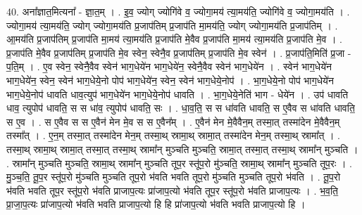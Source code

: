 \documentclass[17pt]{extarticle}
\begin{document}
40. अना᳚ज्ञात॒मित्यना᳚ - ज्ञा॒त॒म् । . इ॒व॒ ज्योग् ज्योगि॑वे व॒ ज्योगा॒मय॑ त्या॒मय॑ति॒ ज्योगि॑वे व॒ ज्योगा॒मय॑ति । . ज्योगा॒मय॑ त्या॒मय॑ति॒ ज्योग् ज्योगा॒मय॑ति प्र॒जाप॑तिम् प्र॒जाप॑ति मा॒मय॑ति॒ ज्योग् ज्योगा॒मय॑ति प्र॒जाप॑तिम् । . आ॒मय॑ति प्र॒जाप॑तिम् प्र॒जाप॑ति मा॒मय॑ त्या॒मय॑ति प्र॒जाप॑ति मे॒वैव प्र॒जाप॑ति मा॒मय॑ त्या॒मय॑ति प्र॒जाप॑ति मे॒व । . प्र॒जाप॑ति मे॒वैव प्र॒जाप॑तिम् प्र॒जाप॑ति मे॒व स्वेन॒ स्वेनै॒व प्र॒जाप॑तिम् प्र॒जाप॑ति मे॒व स्वेन॑ । . प्र॒जाप॑ति॒मिति॑ प्र॒जा - प॒ति॒म् । . ए॒व स्वेन॒ स्वेनै॒वैव स्वेन॑ भाग॒धेये॑न भाग॒धेये॑न॒ स्वेनै॒वैव स्वेन॑ भाग॒धेये॑न । . स्वेन॑ भाग॒धेये॑न भाग॒धेये॑न॒ स्वेन॒ स्वेन॑ भाग॒धेये॒नो पोप॑ भाग॒धेये॑न॒ स्वेन॒ स्वेन॑ भाग॒धेये॒नोप॑ । . भा॒ग॒धेये॒नो पोप॑ भाग॒धेये॑न भाग॒धेये॒नोप॑ धावति धाव॒त्युप॑ भाग॒धेये॑न भाग॒धेये॒नोप॑ धावति । . भा॒ग॒धेये॒नेति॑ भाग - धेये॑न । . उप॑ धावति धाव॒ त्युपोप॑ धावति॒ स स धा॑व॒ त्युपोप॑ धावति॒ सः । . धा॒व॒ति॒ स स धा॑वति धावति॒ स ए॒वैव स धा॑वति धावति॒ स ए॒व । . स ए॒वैव स स ए॒वैन॑ मेन मे॒व स स ए॒वैन᳚म् । . ए॒वैन॑ मेन मे॒वैवैन॒म् तस्मा॒त् तस्मा॑देन मे॒वैवैन॒म् तस्मा᳚त् । . ए॒न॒म् तस्मा॒त् तस्मा॑देन मेन॒म् तस्मा॒थ् स्रामा॒थ् स्रामा॒त् तस्मा॑देन मेन॒म् तस्मा॒थ् स्रामा᳚त् । . तस्मा॒थ् स्रामा॒थ् स्रामा॒त् तस्मा॒त् तस्मा॒थ् स्रामा᳚न् मुञ्चति मुञ्चति॒ स्रामा॒त् तस्मा॒त् तस्मा॒थ् स्रामा᳚न् मुञ्चति । . स्रामा᳚न् मुञ्चति मुञ्चति॒ स्रामा॒थ् स्रामा᳚न् मुञ्चति तूप॒र स्तू॑प॒रो मु॑ञ्चति॒ स्रामा॒थ् स्रामा᳚न् मुञ्चति तूप॒रः । . मु॒ञ्च॒ति॒ तू॒प॒र स्तू॑प॒रो मु॑ञ्चति मुञ्चति तूप॒रो भ॑वति भवति तूप॒रो मु॑ञ्चति मुञ्चति तूप॒रो भ॑वति । . तू॒प॒रो भ॑वति भवति तूप॒र स्तू॑प॒रो भ॑वति प्राजाप॒त्यः प्रा॑जाप॒त्यो भ॑वति तूप॒र स्तू॑प॒रो भ॑वति प्राजाप॒त्यः । . भ॒व॒ति॒ प्रा॒जा॒प॒त्यः प्रा॑जाप॒त्यो भ॑वति भवति प्राजाप॒त्यो हि हि प्रा॑जाप॒त्यो भ॑वति भवति प्राजाप॒त्यो हि । \newline
\end{document}
